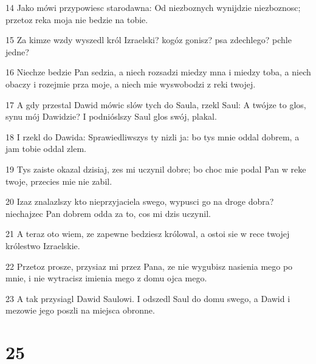 \par 14 Jako mówi przypowiesc starodawna: Od niezboznych wynijdzie niezboznosc; przetoz reka moja nie bedzie na tobie.
\par 15 Za kimze wzdy wyszedl król Izraelski? kogóz gonisz? psa zdechlego? pchle jedne?
\par 16 Niechze bedzie Pan sedzia, a niech rozsadzi miedzy mna i miedzy toba, a niech obaczy i rozejmie prza moje, a niech mie wyswobodzi z reki twojej.
\par 17 A gdy przestal Dawid mówic slów tych do Saula, rzekl Saul: A twójze to glos, synu mój Dawidzie? I podnióslszy Saul glos swój, plakal.
\par 18 I rzekl do Dawida: Sprawiedliwszys ty nizli ja: bo tys mnie oddal dobrem, a jam tobie oddal zlem.
\par 19 Tys zaiste okazal dzisiaj, zes mi uczynil dobre; bo choc mie podal Pan w reke twoje, przecies mie nie zabil.
\par 20 Izaz znalazlszy kto nieprzyjaciela swego, wypusci go na droge dobra? niechajzec Pan dobrem odda za to, cos mi dzis uczynil.
\par 21 A teraz oto wiem, ze zapewne bedziesz królowal, a ostoi sie w rece twojej królestwo Izraelskie.
\par 22 Przetoz prosze, przysiaz mi przez Pana, ze nie wygubisz nasienia mego po mnie, i nie wytracisz imienia mego z domu ojca mego.
\par 23 A tak przysiagl Dawid Saulowi. I odszedl Saul do domu swego, a Dawid i mezowie jego poszli na miejsca obronne.

\chapter{25}

